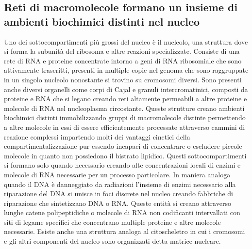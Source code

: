 \subsection{Reti di macromolecole formano un insieme di ambienti biochimici distinti nel nucleo}
Uno dei sottocompartimenti pi\`u grossi del nucleo \`e il nucleolo, una struttura dove si forma la subunit\`a del ribosoma e altre reazioni specializzate. Consiste di una rete di RNA e 
proteine concentrate intorno a geni di RNA ribosomiale che sono attivamente trascritti, presenti in multiple copie nel genoma che sono raggruppate in un singolo nucleolo nonostante si 
trovino su cromosomi diversi. Sono presenti anche diversi organelli come corpi di Cajal e granuli intercromatinici, composti da proteine e RNA che si legano creando reti altamente
permeabili a altre proteine e molecole di RNA nel nucleoplasma circostante. Queste strutture creano ambienti biochimici distinti immobilizzando gruppi di macromolecole distinte 
permettendo a altre molecole in essi di essere efficientemente processate attraverso cammini di reazione complessi impartendo molti dei vantaggi cinetici della compartimentalizzazione 
pur essendo incapaci di concentrare o escludere piccole molecole in quanto non possiedono il bistrato lipidico. Questi sottocompartimenti si formano solo quando necessario creando 
alte concentrazioni locali di enzimi e molecole di RNA necessarie per un processo particolare. In maniera analoga quando il DNA \`e danneggiato da radiazioni l'insieme di enzimi 
necessario alla riparazione del DNA si unisce in foci discrete nel nucleo creando fabbriche di riparazione che sintetizzano DNA o RNA. Queste entit\`a si creano attraverso 
lunghe catene polipeptidiche o molecole di RNA non codificanti intervallati con siti di legame specifici che concentrano multiple proteine e altre molecole necessarie.  Esiste anche una
struttura analoga al citoscheletro in cui i cromosomi e gli altri componenti del nucleo sono organizzati detta matrice nucleare.
